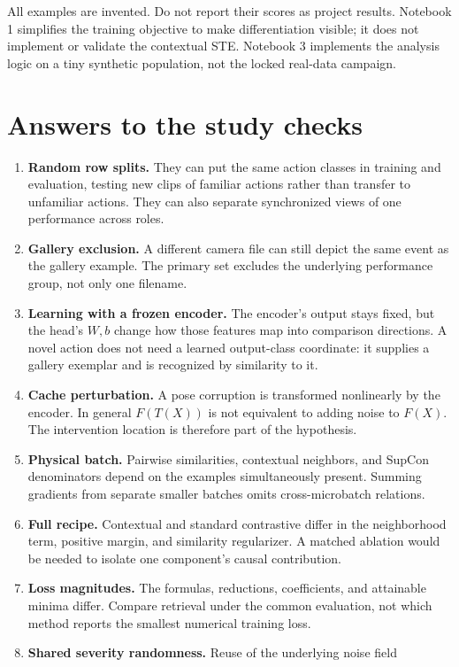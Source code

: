 All examples are invented. Do not report their scores as project results.
Notebook 1 simplifies the training objective to make differentiation visible;
it does not implement or validate the contextual STE. Notebook 3 implements the
analysis logic on a tiny synthetic population, not the locked real-data campaign.

\appendix
\clearpage
\section{Answers to the study checks}
\begin{enumerate}[label=\textbf{\arabic*.},leftmargin=2em]
\item \textbf{Random row splits.} They can put the same action classes in
training and evaluation, testing new clips of familiar actions rather than
transfer to unfamiliar actions. They can also separate synchronized views of
one performance across roles.
\item \textbf{Gallery exclusion.} A different camera file can still depict the
same event as the gallery example. The primary set excludes the underlying
performance group, not only one filename.
\item \textbf{Learning with a frozen encoder.} The encoder's output stays fixed,
but the head's $W,b$ change how those features map into comparison directions.
A novel action does not need a learned output-class coordinate: it supplies a
gallery exemplar and is recognized by similarity to it.
\item \textbf{Cache perturbation.} A pose corruption is transformed nonlinearly
by the encoder. In general $F(T(X))$ is not equivalent to adding noise to $F(X)$.
The intervention location is therefore part of the hypothesis.
\item \textbf{Physical batch.} Pairwise similarities, contextual neighbors, and
SupCon denominators depend on the examples simultaneously present. Summing
gradients from separate smaller batches omits cross-microbatch relations.
\item \textbf{Full recipe.} Contextual and standard contrastive differ in the
neighborhood term, positive margin, and similarity regularizer. A matched
ablation would be needed to isolate one component's causal contribution.
\item \textbf{Loss magnitudes.} The formulas, reductions, coefficients, and
attainable minima differ. Compare retrieval under the common evaluation,
not which method reports the smallest numerical training loss.
\item \textbf{Shared severity randomness.} Reuse of the underlying noise field

\end{enumerate}
